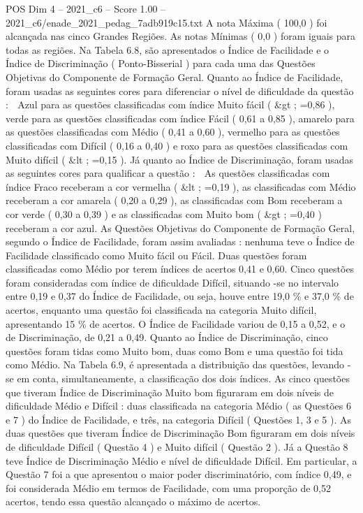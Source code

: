 \begin{textsample}{POS Dim 4 – 2021\_c6 – Score 1.00 – 2021\_c6/enade\_2021\_pedag\_7adb919c15.txt}
A nota Máxima ( 100,0 ) foi alcançada nas cinco Grandes Regiões.
As notas Mínimas ( 0,0 ) foram iguais para todas as regiões.
Na Tabela 6.8, são apresentados o Índice de Facilidade e o Índice de Discriminação ( Ponto-Bisserial ) para cada uma das Questões Objetivas do Componente de Formação Geral.
Quanto ao Índice de Facilidade, foram usadas as seguintes cores para diferenciar o nível de dificuldade da questão :  Azul para as questões classificadas com índice Muito fácil ( \&gt ; =0,86 ), verde para as questões classificadas com índice Fácil ( 0,61 a 0,85 ), amarelo para as questões classificadas com Médio ( 0,41 a 0,60 ), vermelho para as questões classificadas com Difícil ( 0,16 a 0,40 ) e roxo para as questões classificadas com Muito difícil ( \&lt ; =0,15 ).
Já quanto ao Índice de Discriminação, foram usadas as seguintes cores para qualificar a questão :  As questões classificadas com índice Fraco receberam a cor vermelha ( \&lt ; =0,19 ), as classificadas com Médio receberam a cor amarela ( 0,20 a 0,29 ), as classificadas com Bom receberam a cor verde ( 0,30 a 0,39 ) e as classificadas com Muito bom ( \&gt ; =0,40 ) receberam a cor azul.
As Questões Objetivas do Componente de Formação Geral, segundo o Índice de Facilidade, foram assim avaliadas : nenhuma teve o Índice de Facilidade classificado como Muito fácil ou Fácil.
Duas questões foram classificadas como Médio por terem índices de acertos 0,41 e 0,60.
Cinco questões foram consideradas com índice de dificuldade Difícil, situando -se no intervalo entre 0,19 e 0,37 do Índice de Facilidade, ou seja, houve entre 19,0 \% e 37,0 \% de acertos, enquanto uma questão foi classificada na categoria Muito difícil, apresentando 15 \% de acertos.
O Índice de Facilidade variou de 0,15 a 0,52, e o de Discriminação, de 0,21 a 0,49.
Quanto ao Índice de Discriminação, cinco questões foram tidas como Muito bom, duas como Bom e uma questão foi tida como Médio.
Na Tabela 6.9, é apresentada a distribuição das questões, levando -se em conta, simultaneamente, a classificação dos dois índices.
As cinco questões que tiveram Índice de Discriminação Muito bom figuraram em dois níveis de dificuldade Médio e Difícil : duas classificada na categoria Médio ( as Questões 6 e 7 ) do Índice de Facilidade, e três, na categoria Difícil ( Questões 1, 3 e 5 ).
As duas questões que tiveram Índice de Discriminação Bom figuraram em dois níveis de dificuldade Difícil ( Questão 4 ) e Muito difícil ( Questão 2 ).
Já a Questão 8 teve Índice de Discriminação Médio e nível de dificuldade Difícil.
Em particular, a Questão 7 foi a que apresentou o maior poder discriminatório, com índice 0,49, e foi considerada Médio em termos de Facilidade, com uma proporção de 0,52 acertos, tendo essa questão alcançado o máximo de acertos.

\end{textsample}
